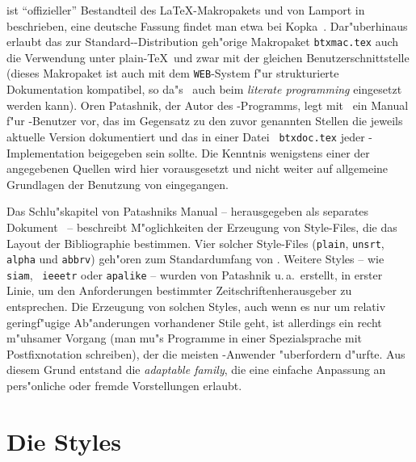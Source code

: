 {\BibTeX} ist "`offizieller"' Bestandteil des \LaTeX-Makropakets und von
Lamport in~\cite{latex} beschrieben, eine deutsche Fassung findet man etwa
bei Kopka~\cite{kopka-einf}. Dar"uberhinaus erlaubt das zur
Standard-\BibTeX-Distribution geh"orige Makropaket {\tt btxmac.tex} auch die
Verwendung unter plain-\TeX\, und zwar mit der gleichen
Benutzerschnittstelle (dieses Makropaket ist auch mit dem {\tt WEB}-System
f"ur strukturierte Dokumentation kompatibel, so da"s \BibTeX\ auch beim {\em
literate programming\/} eingesetzt werden kann). Oren Patashnik, der Autor
des \BibTeX-Programms, legt mit~\cite{bibtex-doc} ein Manual f"ur
\BibTeX-Benutzer vor, das im Gegensatz zu den zuvor genannten Stellen die
jeweils aktuelle Version dokumentiert und das in einer Datei {\tt
btxdoc.tex} jeder \BibTeX-Implementation beigegeben sein sollte. Die
Kenntnis wenigstens einer der angegebenen Quellen wird hier vorausgesetzt
und nicht weiter auf allgemeine Grundlagen der Benutzung von {\BibTeX}
eingegangen.

Das Schlu"skapitel von Patashniks Manual -- herausgegeben als separates
Dokument~\cite{bibtex-hak} -- beschreibt M"oglichkeiten der Erzeugung von
Style-Files, die das Layout der Bibliographie bestimmen. Vier solcher
Style-Files ({\tt plain}, {\tt unsrt}, {\tt alpha} und {\tt abbrv}) geh"oren
zum Standardumfang von {\BibTeX}. Weitere Styles -- wie {\tt siam}, {\tt
ieeetr} oder {\tt apalike} -- wurden von Patashnik u.\,a.~erstellt, in
erster Linie, um den Anforderungen bestimmter Zeitschriftenherausgeber zu
entsprechen. Die Erzeugung von solchen Styles, auch wenn es nur um relativ
geringf"ugige Ab"anderungen vorhandener Stile geht, ist allerdings ein recht
m"uhsamer Vorgang (man mu"s Programme in einer Spezialsprache mit
Postfixnotation schreiben), der die meisten {\BibTeX}-Anwender "uberfordern
d"urfte. Aus diesem Grund entstand die {\em adaptable family}, die eine
einfache Anpassung an pers"onliche oder fremde Vorstellungen erlaubt.

\section*{Die Styles} %

